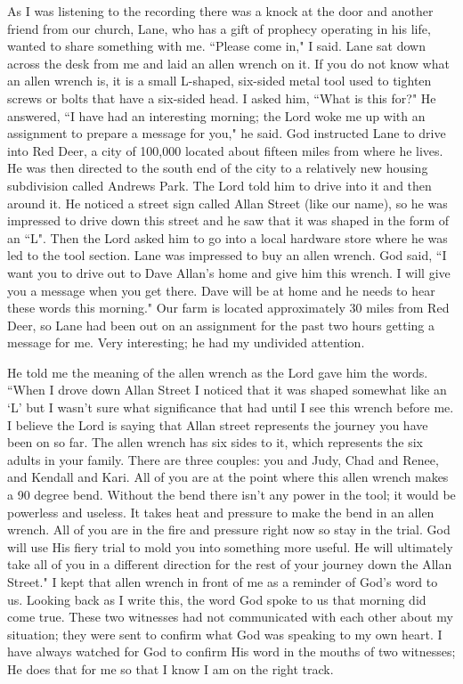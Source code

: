 \documentclass[oneside,12pt]{book}
\begin{document}
As I was listening to the recording there was a knock at the door and another friend from our church, Lane, who has a gift of prophecy operating in his life, wanted to share something with me. ``Please come in," I said. Lane sat down across the desk from me and laid an allen wrench on it. If you do not know what an allen wrench is, it is a small L-shaped, six-sided metal tool used to tighten screws or bolts that have a six-sided head. I asked him, ``What is this for?" He answered, ``I have had an interesting morning; the Lord woke me up with an assignment to prepare a message for you," he said. God instructed Lane to drive into Red Deer, a city of 100,000 located about fifteen miles from where he lives. He was then directed to the south end of the city to a relatively new housing subdivision called Andrews Park. The Lord told him to drive into it and then around it. He noticed a street sign called Allan Street (like our name), so he was impressed to drive down this street and he saw that it was shaped in the form of an ``L". Then the Lord asked him to go into a local hardware store where he was led to the tool section. Lane was impressed to buy an allen wrench. God said, ``I want you to drive out to Dave Allan's home and give him this wrench. I will give you a message when you get there. Dave will be at home and he needs to hear these words this morning." Our farm is located approximately 30 miles from Red Deer, so Lane had been out on an assignment for the past two hours getting a message for me. Very interesting; he had my undivided attention. 


He told me the meaning of the allen wrench as the Lord gave him the words. ``When I drove down Allan Street I noticed that it was shaped somewhat like an `L' but I wasn't sure what significance that had until I see this wrench before me. I believe the Lord is saying that Allan street represents the journey you have been on so far. The allen wrench has six sides to it, which represents the six adults in your family. There are three couples: you and Judy, Chad and Renee, and Kendall and Kari. All of you are at the point where this allen wrench makes a 90 degree bend. Without the bend there isn't any power in the tool; it would be powerless and useless. It takes heat and pressure to make the bend in an allen wrench. All of you are in the fire and pressure right now so stay in the trial. God will use His fiery trial to mold you into something more useful. He will ultimately take all of you in a different direction for the rest of your journey down the Allan Street." I kept that allen wrench in front of me as a reminder of God's word to us. Looking back as I write this, the word God spoke to us that morning did come true. These two witnesses had not communicated with each other about my situation; they were sent to confirm what God was speaking to my own heart. I have always watched for God to confirm His word in the mouths of two witnesses; He does that for me so that I know I am on the right track.
\end{document}
